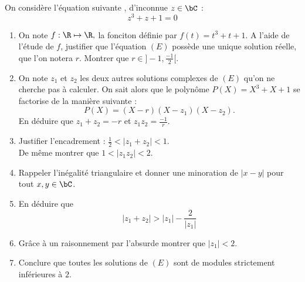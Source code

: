 \begin{exercice}
On considère l'équation suivante , d'inconnue $z\in \bC$ : 
\begin{equation}\tag{$E$}
z^3 +z+1=0
\end{equation} 



\begin{enumerate}
\item On note $f : \R\mapsto \R, $ la fonciton définie par $f(t) = t^3+t+1.$
A l'aide de l'étude de $f$, justifier que l'équation $(E)$ possède une unique solution réelle, que l'on notera $r$. Montrer que $r \in ]-1, \frac{-1}{2}[$.
\item On note $z_1$ et $z_2$ les deux autres solutions complexes de $(E)$ qu'on ne cherche pas à calculer. On sait alors que le polynôme $P(X) = X^3+X+1$ se factorise de la manière suivante : 
$$P(X)  = (X-r)(X-z_1) (X-z_2).$$
En déduire que $z_1+z_2=-r$ et $z_1z_2=\frac{-1}{r}$.
\item Justifier l'encadrement  : $\frac{1}{2}<|z_1+z_2 |<1.$\\
De même montrer que  $1< |z_1z_2|< 2.$
\item Rappeler l'inégalité triangulaire et donner une minoration de $|x-y|$ pour tout $x,y\in \bC$. 

\item En déduire que $$|z_1+z_2| >|z_1| -\frac{2}{|z_1|}$$

\item Grâce à un raisonnement par l'absurde montrer que $|z_1|<2$.



\item Conclure que toutes les solutions de $(E)$ sont de modules strictement inférieures à $2$. 

%
%


\end{enumerate}

\end{exercice}


